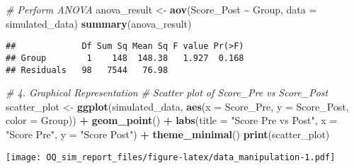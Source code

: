 \documentclass[
]{article}
\newenvironment{Shaded}{\begin{snugshade}}{\end{snugshade}}
\newcommand{\AttributeTok}[1]{\textcolor[rgb]{0.13,0.29,0.53}{#1}}
\newcommand{\CommentTok}[1]{\textcolor[rgb]{0.56,0.35,0.01}{\textit{#1}}}
\newcommand{\FunctionTok}[1]{\textcolor[rgb]{0.13,0.29,0.53}{\textbf{#1}}}
\newcommand{\NormalTok}[1]{#1}
\newcommand{\OtherTok}[1]{\textcolor[rgb]{0.56,0.35,0.01}{#1}}
\newcommand{\SpecialCharTok}[1]{\textcolor[rgb]{0.81,0.36,0.00}{\textbf{#1}}}
\newcommand{\StringTok}[1]{\textcolor[rgb]{0.31,0.60,0.02}{#1}}
\begin{document}
\begin{Shaded}
\begin{Highlighting}[]
\CommentTok{\# Perform ANOVA}
\NormalTok{anova\_result }\OtherTok{\textless{}{-}} \FunctionTok{aov}\NormalTok{(Score\_Post }\SpecialCharTok{\textasciitilde{}}\NormalTok{ Group, }\AttributeTok{data =}\NormalTok{ simulated\_data)}
\FunctionTok{summary}\NormalTok{(anova\_result)}
\end{Highlighting}
\end{Shaded}

\begin{verbatim}
##             Df Sum Sq Mean Sq F value Pr(>F)
## Group        1    148  148.38   1.927  0.168
## Residuals   98   7544   76.98
\end{verbatim}

\begin{Shaded}
\begin{Highlighting}[]
\CommentTok{\# 4. Graphical Representation}
\CommentTok{\# Scatter plot of Score\_Pre vs Score\_Post}
\NormalTok{scatter\_plot }\OtherTok{\textless{}{-}} \FunctionTok{ggplot}\NormalTok{(simulated\_data, }\FunctionTok{aes}\NormalTok{(}\AttributeTok{x =}\NormalTok{ Score\_Pre, }\AttributeTok{y =}\NormalTok{ Score\_Post, }\AttributeTok{color =}\NormalTok{ Group)) }\SpecialCharTok{+}
  \FunctionTok{geom\_point}\NormalTok{() }\SpecialCharTok{+}
  \FunctionTok{labs}\NormalTok{(}\AttributeTok{title =} \StringTok{"Score Pre vs Post"}\NormalTok{, }\AttributeTok{x =} \StringTok{"Score Pre"}\NormalTok{, }\AttributeTok{y =} \StringTok{"Score Post"}\NormalTok{) }\SpecialCharTok{+}
  \FunctionTok{theme\_minimal}\NormalTok{()}
\FunctionTok{print}\NormalTok{(scatter\_plot)}
\end{Highlighting}
\end{Shaded}

\texttt{[image: OQ\_sim\_report\_files/figure-latex/data\_manipulation-1.pdf]}
\end{document}

